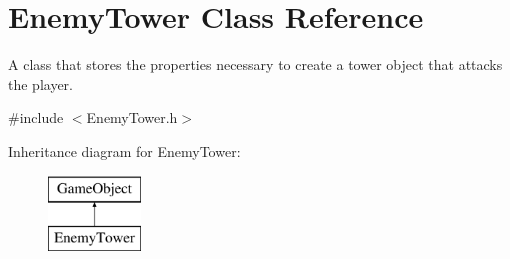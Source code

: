 \hypertarget{class_enemy_tower}{}\section{Enemy\+Tower Class Reference}
\label{class_enemy_tower}


A class that stores the properties necessary to create a tower object that attacks the player.  




{\ttfamily \#include $<$Enemy\+Tower.\+h$>$}

Inheritance diagram for Enemy\+Tower\+:\begin{figure}[H]
\begin{center}
\leavevmode
\includegraphics[height=2.000000cm]{class_enemy_tower}
\end{center}
\end{figure}
